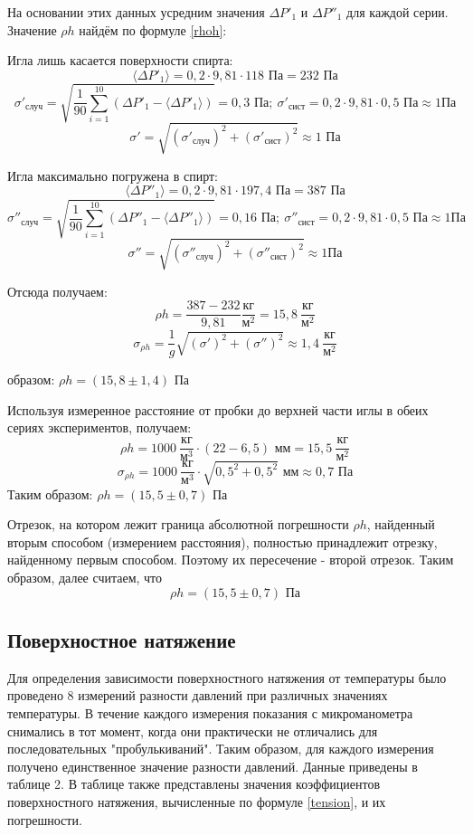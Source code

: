 \documentclass[15pt,a5paper,reqno]{article}
\begin{document}
    На основании этих данных усредним значения $\Delta P'_1$ и $\Delta P''_1$ для каждой серии. Значение $\rho h$ найдём по формуле \eqref{rhoh}:

    \noindent Игла лишь касается поверхности спирта:
    \[\langle\Delta P'_1\rangle = 0,2 \cdot 9,81 \cdot 118\text{ Па} = 232\text{ Па}\]
    \[\sigma'_{\text{случ}} = \sqrt{\frac{1}{90}\sum_{i = 1}^{10}(\Delta P'_1 - \langle\Delta P'_1\rangle)} = 0,3\text{ Па};\ \sigma'_{\text{сист}} = 0,2 \cdot 9,81 \cdot 0,5\text{ Па} \approx 1\text {Па}\]
    \[\sigma' = \sqrt{(\sigma'_{\text{случ}})^2 + (\sigma'_{\text{сист}})^2} \approx 1\text{ Па}\]
    
    \noindent Игла максимально погружена в спирт:
    \[\langle\Delta P''_1\rangle = 0,2 \cdot 9,81 \cdot 197,4\text{ Па} = 387\text{ Па}\]
    \[\sigma''_{\text{случ}} = \sqrt{\frac{1}{90}\sum_{i = 1}^{10}(\Delta P''_1 - \langle\Delta P''_1\rangle)} = 0,16\text{ Па};\ \sigma''_{\text{сист}} = 0,2 \cdot 9,81 \cdot 0,5\text{ Па} \approx 1\text {Па}\]
    \[\sigma'' = \sqrt{(\sigma''_{\text{случ}})^2 + (\sigma''_{\text{сист}})^2} \approx 1\text {Па}\]
    
    \noindent Отсюда получаем:
    \[\rho h = \frac{387 - 232}{9,81}\frac{\text{кг}}{\text{м}^2} = 15,8\ \frac{\text{кг}}{\text{м}^2}\]
    \[\sigma_{\rho h} = \frac{1}{g}\sqrt{(\sigma')^2 + (\sigma'')^2} \approx 1,4\ \frac{\text{кг}}{\text{м}^2}\]
    
     образом: $\rho h = (15,8 \pm 1,4)\text{ Па}$
    
    Используя измеренное расстояние от пробки до верхней части иглы в обеих сериях экспериментов, получаем:
    \[\rho h = 1000\ \frac{\text{кг}}{\text{м}^3} \cdot (22 - 6,5)\text{ мм} = 15,5\ \frac{\text{кг}}{\text{м}^2}\]
    \[\sigma_{\rho h} = 1000\ \frac{\text{кг}}{\text{м}^3} \cdot \sqrt{0,5^2 + 0,5^2}\text{ мм} \approx 0,7\text{ Па}\]
    Таким образом: $\rho h = (15,5 \pm 0,7)\text{ Па}$
    
    Отрезок, на котором лежит граница абсолютной погрешности $\rho h$, найденный вторым способом (измерением расстояния), полностью принадлежит отрезку, найденному первым способом. Поэтому их пересечение - второй отрезок. Таким образом, далее считаем, что 
    \[\rho h = (15,5 \pm 0,7)\text{ Па}\]
    
    \subsection{Поверхностное натяжение}
    Для определения зависимости поверхностного натяжения от температуры было проведено 8 измерений разности давлений при различных значениях температуры. В течение каждого измерения показания с микроманометра снимались в тот момент, когда они практически не отличались для последовательных "пробулькиваний". Таким образом, для каждого измерения получено единственное значение разности давлений. Данные приведены в таблице 2. В таблице также представлены значения коэффициентов поверхностного натяжения, вычисленные по формуле \eqref{tension}, и их погрешности.
    
\end{document}
